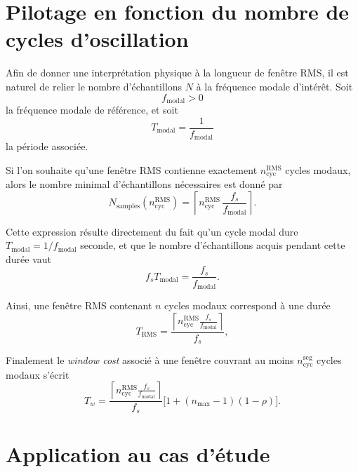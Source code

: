 \documentclass[12pt,a4paper, openany]{book}
\begin{document}
\section{Pilotage en fonction du nombre de cycles d'oscillation}

Afin de donner une interprétation physique à la longueur de fenêtre RMS, il est naturel de relier le nombre d'échantillons $N$ à la fréquence modale d'intérêt. Soit
\begin{equation}
f_{\mathrm{modal}} > 0
\end{equation}
la fréquence modale de référence, et soit
\begin{equation}
T_{\mathrm{modal}} = \frac{1}{f_{\mathrm{modal}}}
\end{equation}
la période associée.

Si l'on souhaite qu'une fenêtre RMS contienne exactement $n_{\mathrm{cyc}}^{\mathrm{RMS}}$ cycles modaux, alors le nombre minimal d'échantillons nécessaires est donné par
\begin{equation}
N_{\mathrm{samples}}\!\left(n_{\mathrm{cyc}}^{\mathrm{RMS}}\right)
=
\left\lceil
n_{\mathrm{cyc}}^{\mathrm{RMS}}\,\frac{f_s}{f_{\mathrm{modal}}}
\right\rceil.
\label{eq:nsamples_cycles}
\end{equation}

Cette expression résulte directement du fait qu'un cycle modal dure $T_{\mathrm{modal}} = 1/f_{\mathrm{modal}}$ seconde, et que le nombre d'échantillons acquis pendant cette durée vaut
\begin{equation}
f_s T_{\mathrm{modal}} = \frac{f_s}{f_{\mathrm{modal}}}.
\end{equation}

Ainsi, une fenêtre RMS contenant $n$ cycles modaux correspond à une durée
\begin{equation}
T_{\mathrm{RMS}}=
\frac{
\left\lceil
n_{\mathrm{cyc}}^{\mathrm{RMS}}
\frac{f_s}{f_{\mathrm{modal}}}
\right\rceil}{f_s},
\end{equation}

Finalement le \textit{window cost} associé à une fenêtre couvrant au moins $n_{\mathrm{cyc}}^{\mathrm{seg}}$ cycles modaux s'écrit
\begin{equation}
    T_w =
    \frac{
    \left\lceil
    n_{\mathrm{cyc}}^{\mathrm{RMS}}
    \frac{f_s}{f_{\mathrm{modal}}}
    \right\rceil
    }{f_s} 
    \bigl[1+(n_{\max}-1)(1-\rho)\bigr].
    \label{eq:rms_window_cost_n_cyc}
\end{equation}

\section{Application au cas d'étude}
\end{document}
